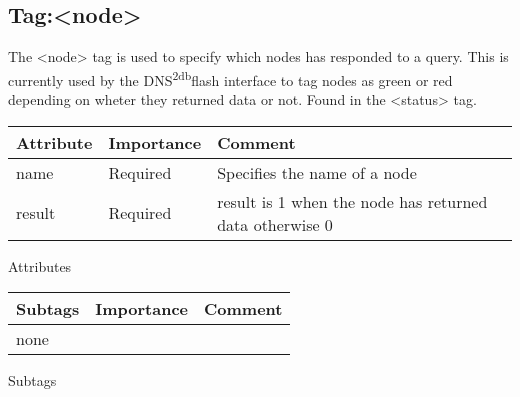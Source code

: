 \documentclass[a4paper]{article}
\newcommand{\xml}[1]{\textless#1\textgreater}
\newcommand{\dnsdb}{DNS\textsuperscript{2db}}
\begin{document}
    \subsection{Tag:\xml{node}  }
    The \xml{node} tag is used to specify which nodes has responded to a query. 
    This is currently used by the \dnsdb flash interface to tag nodes as green 
    or red depending on wheter they returned data or not. 
    Found in the \xml{status} tag.
    \begin{center}
        \begin{tabular}{ | p{2.1cm} | p{2cm} | p{9cm} |}
        \hline
        \textbf{Attribute} & \textbf{Importance} & \textbf{Comment}  
        \\ \hline
        name
        &
        Required
        &
        Specifies the name of a node
        \\ \hline
        result
        &
        Required
        &
        result is 1 when the node has returned data otherwise 0 
        \\ \hline
        \end{tabular}
        
        \small Attributes
        
        \begin{tabular}{ | p{2.1cm} | p{2cm} | p{9cm} |}
        \hline
        \textbf{Subtags} & \textbf{Importance} & \textbf{Comment}  
        \\ \hline
        none
        & &
        \\ \hline
        \end{tabular}
        
        \small Subtags
    \end{center}        
\end{document}
